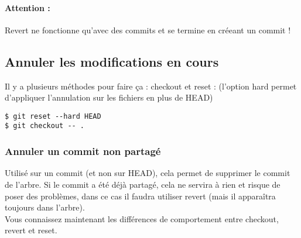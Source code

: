 \paragraph{Attention : } Revert ne fonctionne qu'avec des commits et se termine en créeant un commit !

\newpage
\subsection{Annuler les modifications en cours}

Il y a plusieurs méthodes pour faire ça : checkout et reset :
(l'option hard permet d'appliquer l'annulation sur les fichiers en plus de HEAD)

\begin{verbatim}
$ git reset --hard HEAD
$ git checkout -- .
\end{verbatim}

\subsubsection{Annuler un commit non partagé}
Utilisé sur un commit (et non sur HEAD), cela permet de supprimer le commit de l'arbre.
Si le commit a été déjà partagé, cela ne servira à rien et risque de poser des problèmes, dans ce cas il faudra utiliser revert (mais il apparaîtra toujours dans l'arbre).\\

Vous connaissez maintenant les différences de comportement entre checkout, revert et reset.



